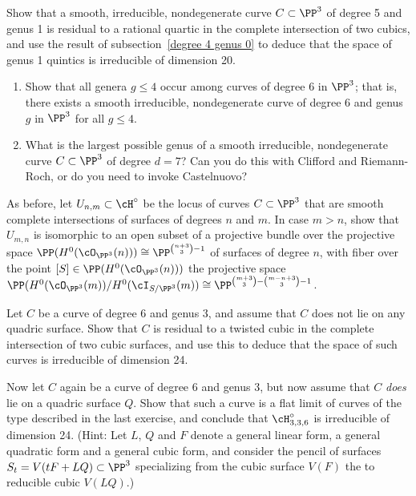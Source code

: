 \begin{exercise}\label{quintics genus 1}
Show that a smooth, irreducible, nondegenerate curve $C \subset \PP^3$ of degree 5 and genus 1 is residual to a rational quartic in the complete intersection of two cubics, and use the result of subsection~\ref{degree 4 genus 0} to deduce that the space of genus 1 quintics is irreducible of dimension 20.
\end{exercise}

\begin{exercise}
\begin{enumerate}
\item Show that all genera $g \leq 4$  occur among curves of degree 6 in $\PP^3$; that is, there exists a smooth irreducible, nondegenerate curve of degree 6 and genus $g$ in $\PP^3$ for all $g \leq 4$.
\item What is the largest possible genus of a smooth irreducible, nondegenerate curve $C \subset \PP^3$ of degree $d=7$? Can you do this with Clifford and Riemann-Roch, or do you need to invoke Castelnuovo?
\end{enumerate}
\end{exercise}

\begin{exercise}\label{second complete intersection exercise}
As before, let $U_{n,m} \subset \cH^\circ$ be the locus of curves $C \subset \PP^3$ that are smooth complete intersections of surfaces of degrees $n$ and $m$.
 In case $m > n$, show that $U_{m,n}$ is isomorphic to an open subset of a projective bundle over the projective space $\PP(H^0(\cO_{\PP^3}(n))) \cong \PP^{\binom{n+3}{3}-1}$ of surfaces of degree $n$, with fiber over the point $[S] \in \PP(H^0(\cO_{\PP^3}(n)))$ the projective space $\PP(H^0(\cO_{\PP^3}(m))/H^0(\cI_{S/\PP^3}(m)) \cong \PP^{\binom{m+3}{3} - \binom{m-n+3}{3} - 1}$.
\end{exercise}

\begin{exercise}\label{6,3:1}
Let $C$ be a curve of degree 6 and genus 3, and assume that $C$ does not lie on any quadric surface. Show that $C$ is residual to a twisted cubic in the complete intersection of two cubic surfaces, and use this to deduce that the space of such curves is irreducible of dimension 24.
\end{exercise}


\begin{exercise}\label{6,3:2}
Now let $C$ again be a curve of degree 6 and genus 3, but now assume that $C$ \emph{does} lie on a quadric surface $Q$. Show that such a curve is a flat limit of curves of the type described in the last exercise, and conclude that $\cH^\circ_{3,3,6}$ is irreducible of dimension 24. (Hint: Let $L$, $Q$ and $F$ denote a general linear form, a general quadratic form and a general cubic form, and consider the pencil of surfaces $S_t = V(tF + LQ) \subset \PP^3$ specializing from the cubic surface $V(F)$ the to reducible cubic $V(LQ)$.)
\end{exercise}

